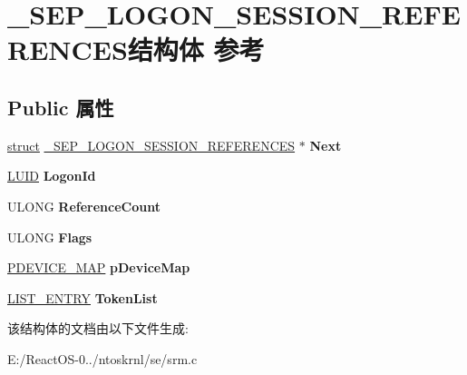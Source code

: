 \hypertarget{struct___s_e_p___l_o_g_o_n___s_e_s_s_i_o_n___r_e_f_e_r_e_n_c_e_s}{}\section{\+\_\+\+S\+E\+P\+\_\+\+L\+O\+G\+O\+N\+\_\+\+S\+E\+S\+S\+I\+O\+N\+\_\+\+R\+E\+F\+E\+R\+E\+N\+C\+E\+S结构体 参考}
\label{struct___s_e_p___l_o_g_o_n___s_e_s_s_i_o_n___r_e_f_e_r_e_n_c_e_s}
\subsection*{Public 属性}
\begin{DoxyCompactItemize}
\item 
\mbox{\label{struct___s_e_p___l_o_g_o_n___s_e_s_s_i_o_n___r_e_f_e_r_e_n_c_e_s_af738a65899224d657af8ec788c662405}} 
\hyperlink{interfacestruct}{struct} \hyperlink{struct___s_e_p___l_o_g_o_n___s_e_s_s_i_o_n___r_e_f_e_r_e_n_c_e_s}{\+\_\+\+S\+E\+P\+\_\+\+L\+O\+G\+O\+N\+\_\+\+S\+E\+S\+S\+I\+O\+N\+\_\+\+R\+E\+F\+E\+R\+E\+N\+C\+ES} $\ast$ {\bfseries Next}
\item 
\mbox{\label{struct___s_e_p___l_o_g_o_n___s_e_s_s_i_o_n___r_e_f_e_r_e_n_c_e_s_acd738c25e2c2f1978f593352617ed827}} 
\hyperlink{struct___l_u_i_d}{L\+U\+ID} {\bfseries Logon\+Id}
\item 
\mbox{\label{struct___s_e_p___l_o_g_o_n___s_e_s_s_i_o_n___r_e_f_e_r_e_n_c_e_s_a94185f06494d61100c5a133e1ee0fd7a}} 
U\+L\+O\+NG {\bfseries Reference\+Count}
\item 
\mbox{\label{struct___s_e_p___l_o_g_o_n___s_e_s_s_i_o_n___r_e_f_e_r_e_n_c_e_s_ae3f1143551e7c245e121fa6de82905d6}} 
U\+L\+O\+NG {\bfseries Flags}
\item 
\mbox{\label{struct___s_e_p___l_o_g_o_n___s_e_s_s_i_o_n___r_e_f_e_r_e_n_c_e_s_a70e08c20092a017323c626ca074ef9aa}} 
\hyperlink{struct___d_e_v_i_c_e___m_a_p}{P\+D\+E\+V\+I\+C\+E\+\_\+\+M\+AP} {\bfseries p\+Device\+Map}
\item 
\mbox{\label{struct___s_e_p___l_o_g_o_n___s_e_s_s_i_o_n___r_e_f_e_r_e_n_c_e_s_a4d63c32f47cb9cc08ecf5d38ea7bf14b}} 
\hyperlink{struct___l_i_s_t___e_n_t_r_y}{L\+I\+S\+T\+\_\+\+E\+N\+T\+RY} {\bfseries Token\+List}
\end{DoxyCompactItemize}


该结构体的文档由以下文件生成\+:\begin{DoxyCompactItemize}
\item 
E\+:/\+React\+O\+S-\/0../ntoskrnl/se/srm.\+c\end{DoxyCompactItemize}
